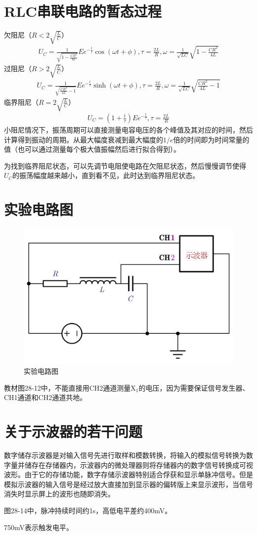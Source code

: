 \documentclass{ctexart}
\begin{document}
	\section{RLC串联电路的暂态过程}
	欠阻尼（$R<2\sqrt{\frac{L}{C}}$）
	\begin{align}
		U_C=\frac{1}{\sqrt{1-\frac{CR^2}{4L}}}Ee^{-\frac{t}{\tau}}\cos{(\omega t+\phi)},\tau=\frac{2L}{R},\omega=\frac{1}{\sqrt{LC}}\sqrt{1-\frac{CR^2}{4L}}
	\end{align}
	过阻尼（$R>2\sqrt{\frac{L}{C}}$）
	\begin{align}
		U_C=\frac{1}{\sqrt{\frac{CR^2}{4L}-1}}Ee^{-\frac{t}{\tau}}\sinh{(\omega t+\phi)},\tau=\frac{2L}{R},\omega=\frac{1}{\sqrt{LC}}\sqrt{\frac{CR^2}{4L}-1}
	\end{align}
	临界阻尼（$R=2\sqrt{\frac{L}{C}}$）
	\begin{align}
		U_C=\left(1+\frac{t}{\tau}\right)Ee^{-\frac{t}{\tau}},\tau=\frac{2L}{R}
	\end{align}
	小阻尼情况下，振荡周期可以直接测量电容电压的各个峰值及其对应的时间，然后计算得到振动的周期。从最大幅度衰减到最大幅度的$1/e$倍的时间即为时间常量的值（也可以通过测量每个极大值振幅然后进行拟合得到）。
	
	为找到临界阻尼状态，可以先调节电阻使电路在欠阻尼状态，然后慢慢调节使得$U_C$的振荡幅度越来越小，直到看不见，此时达到临界阻尼状态。
	\section{实验电路图}
	\begin{figure}[H]
		\centering
		\includegraphics[width=0.6\linewidth]{fig.png}
		\caption{实验电路图}
	\end{figure}
	教材图28-12中，不能直接用CH2通道测量$\text{X}_1$的电压，因为需要保证信号发生器、CH1通道和CH2通道共地。
	\section{关于示波器的若干问题}
	数字储存示波器是对输入信号先进行取样和模数转换，将输入的模拟信号转换为数字量并储存在存储器内，示波器内的微处理器则将存储器内的数字信号转换成可视波形。由于它的存储功能，数字存储示波器特别适合俘获和显示单脉冲信号。但是模拟示波器的输入信号是经过放大直接加到显示器的偏转版上来显示波形，当信号消失时显示屏上的波形也随即消失。
	
	图28-14中，脉冲持续时间约1s，高低电平差约400mV。
	
	750mV表示触发电平。
\end{document}
